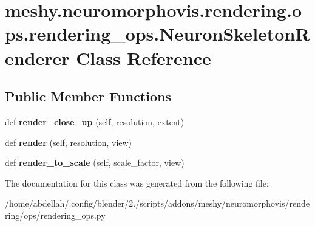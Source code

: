 \hypertarget{classmeshy_1_1neuromorphovis_1_1rendering_1_1ops_1_1rendering__ops_1_1NeuronSkeletonRenderer}{}\section{meshy.\+neuromorphovis.\+rendering.\+ops.\+rendering\+\_\+ops.\+Neuron\+Skeleton\+Renderer Class Reference}
\label{classmeshy_1_1neuromorphovis_1_1rendering_1_1ops_1_1rendering__ops_1_1NeuronSkeletonRenderer}
\subsection*{Public Member Functions}
\begin{DoxyCompactItemize}
\item 
def {\bfseries render\+\_\+close\+\_\+up} (self, resolution, extent)\hypertarget{classmeshy_1_1neuromorphovis_1_1rendering_1_1ops_1_1rendering__ops_1_1NeuronSkeletonRenderer_ac372d40656d584d4cdd181e541aea3a0}{}\label{classmeshy_1_1neuromorphovis_1_1rendering_1_1ops_1_1rendering__ops_1_1NeuronSkeletonRenderer_ac372d40656d584d4cdd181e541aea3a0}

\item 
def {\bfseries render} (self, resolution, view)\hypertarget{classmeshy_1_1neuromorphovis_1_1rendering_1_1ops_1_1rendering__ops_1_1NeuronSkeletonRenderer_a670a16261e46859541c6bc24227b1ef5}{}\label{classmeshy_1_1neuromorphovis_1_1rendering_1_1ops_1_1rendering__ops_1_1NeuronSkeletonRenderer_a670a16261e46859541c6bc24227b1ef5}

\item 
def {\bfseries render\+\_\+to\+\_\+scale} (self, scale\+\_\+factor, view)\hypertarget{classmeshy_1_1neuromorphovis_1_1rendering_1_1ops_1_1rendering__ops_1_1NeuronSkeletonRenderer_a3abee03dd435733b9c376796218c3263}{}\label{classmeshy_1_1neuromorphovis_1_1rendering_1_1ops_1_1rendering__ops_1_1NeuronSkeletonRenderer_a3abee03dd435733b9c376796218c3263}

\end{DoxyCompactItemize}


The documentation for this class was generated from the following file\+:\begin{DoxyCompactItemize}
\item 
/home/abdellah/.\+config/blender/2./scripts/addons/meshy/neuromorphovis/rendering/ops/rendering\+\_\+ops.\+py\end{DoxyCompactItemize}
